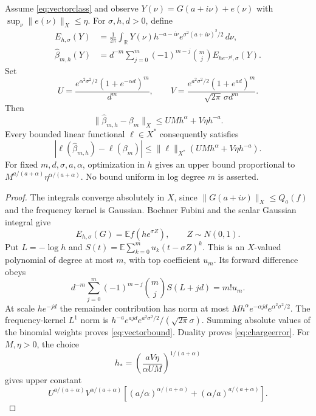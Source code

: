\begin{theorem}
\label{thm:vectorlogs}
Assume \eqref{eq:vectorclass} and observe
$Y(\nu)=G(a+i\nu)+e(\nu)$ with
$\sup_\nu\|e(\nu)\|_X\le\eta$.
For $\sigma,h,d>0$, define
\begin{align}
 E_{h,\sigma}(Y)&=\frac1{2\pi}\int_{\mathbb R}
 Y(\nu)h^{-a-i\nu}e^{\sigma^2(a+i\nu)^2/2}\,d\nu,
 \label{eq:vectoraverage}\\
 \widehat\beta_{m,h}(Y)&=d^{-m}\sum_{j=0}^m
 (-1)^{m-j}\binom mj E_{he^{-jd},\sigma}(Y).
 \label{eq:logestimator}
\end{align}
Set
\begin{equation}\label{eq:UVconstants}
 U=\frac{e^{\alpha^2\sigma^2/2}(1+e^{-\alpha d})^m}{d^m},
 \qquad
 V=\frac{e^{a^2\sigma^2/2}(1+e^{ad})^m}
 {\sqrt{2\pi}\,\sigma d^m}.
\end{equation}
Then
\begin{equation}\label{eq:vectorbound}
 \|\widehat\beta_{m,h}-\beta_m\|_X
 \le UMh^\alpha+V\eta h^{-a}.
\end{equation}
Every bounded linear functional $\ell\in X^*$ consequently satisfies
\begin{equation}\label{eq:chargeerror}
 |\ell(\widehat\beta_{m,h})-\ell(\beta_m)|
 \le\|\ell\|_{X^*}(UMh^\alpha+V\eta h^{-a}).
\end{equation}
For fixed $m,d,\sigma,a,\alpha$, optimization in $h$ gives an upper
bound proportional to
$M^{a/(a+\alpha)}\eta^{\alpha/(a+\alpha)}$.
No bound uniform in log degree $m$ is asserted.
\end{theorem}
\begin{proof}
The integrals converge absolutely in $X$, since
$\|G(a+i\nu)\|_X\le Q_a(f)$ and the frequency kernel is Gaussian.
Bochner Fubini and the scalar Gaussian integral give
\[
 E_{h,\sigma}(G)=\mathbb E f(he^{\sigma Z}),\qquad Z\sim N(0,1).
\]
Put $L=-\log h$ and
$S(t)=\mathbb E\sum_{k=0}^m u_k(t-\sigma Z)^k$.
This is an $X$-valued polynomial of degree at most $m$, with top
coefficient $u_m$. Its forward difference obeys
\[
 d^{-m}\sum_{j=0}^m(-1)^{m-j}\binom mj S(L+jd)=m!u_m.
\]
At scale $he^{-jd}$ the remainder contribution has norm at most
$Mh^\alpha e^{-\alpha jd}e^{\alpha^2\sigma^2/2}$.
The frequency-kernel $L^1$ norm is
$h^{-a}e^{ajd}e^{a^2\sigma^2/2}/(\sqrt{2\pi}\sigma)$.
Summing absolute values of the binomial weights proves
\eqref{eq:vectorbound}. Duality proves \eqref{eq:chargeerror}.
For $M,\eta>0$, the choice
\[
 h_* =\left(\frac{aV\eta}{\alpha UM}\right)^{1/(a+\alpha)}
\]
gives upper constant
\[
 U^{a/(a+\alpha)}V^{\alpha/(a+\alpha)}
 \left[(a/\alpha)^{\alpha/(a+\alpha)}
       +(\alpha/a)^{a/(a+\alpha)}\right].
\]
\end{proof}


